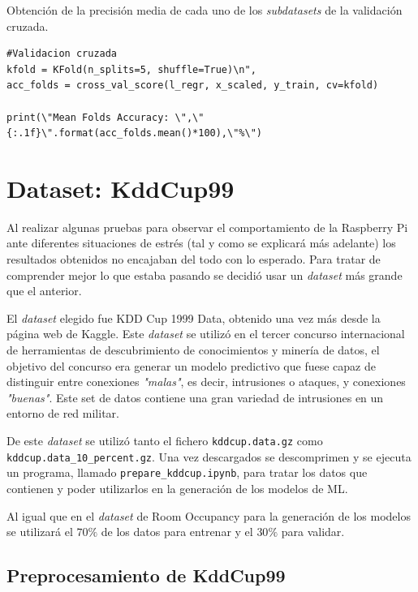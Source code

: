\documentclass[a4paper, 12pt]{book}
\begin{document}
 \begin{listing}[htb]
    \caption{Obtención de la precisión media de cada uno de los \textit{subdatasets} de la validación cruzada.}{}
    \label{lst:get_CV}
    \begin{verbatim}
#Validacion cruzada
kfold = KFold(n_splits=5, shuffle=True)\n",
acc_folds = cross_val_score(l_regr, x_scaled, y_train, cv=kfold)

print(\"Mean Folds Accuracy: \",\"{:.1f}\".format(acc_folds.mean()*100),\"%\")
    \end{verbatim}
\end{listing}
 


\section{Dataset: KddCup99}
\label{subsec:dataset_kddcup99}

Al realizar algunas pruebas para observar el comportamiento de la Raspberry Pi ante diferentes situaciones de estrés (tal y como se explicará más adelante) los resultados obtenidos no encajaban del todo con lo esperado. Para tratar de comprender mejor lo que estaba pasando se decidió usar un \textit{dataset} más grande que el anterior.

El \textit{dataset} elegido fue KDD Cup 1999 Data\cite{DataSetKddCup99}, obtenido una vez más desde la página web de Kaggle. Este \textit{dataset} se utilizó en el tercer concurso internacional de herramientas de descubrimiento de conocimientos y minería de datos, el objetivo del concurso era generar un modelo predictivo que fuese capaz de distinguir entre conexiones \textit{"malas"}, es decir, intrusiones o ataques, y conexiones \textit{"buenas"}. Este set de datos contiene una gran variedad de intrusiones en un entorno de red militar. 

De este \textit{dataset} se utilizó tanto el fichero \texttt{kddcup.data.gz} como \\\texttt{kddcup.data\_10\_percent.gz}. Una vez descargados se descomprimen y se ejecuta un programa, llamado \texttt{prepare\_kddcup.ipynb}, para tratar los datos que contienen y poder utilizarlos en la generación de los modelos de ML.

Al igual que en el \textit{dataset} de Room Occupancy para la generación de los modelos se utilizará el $70\%$ de los datos para entrenar y el $30\%$ para validar.

\subsection{Preprocesamiento de KddCup99}
\label{subsec:preprocesamiento_kddcup}
\end{document}
